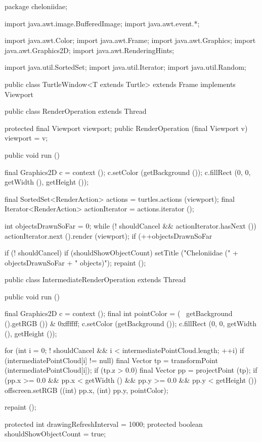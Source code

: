 \documentclass{report}
\begin{document}
\begin{javacode}
package cheloniidae;

import java.awt.image.BufferedImage;
import java.awt.event.*;

import java.awt.Color;
import java.awt.Frame;
import java.awt.Graphics;
import java.awt.Graphics2D;
import java.awt.RenderingHints;

import java.util.SortedSet;
import java.util.Iterator;
import java.util.Random;

public class TurtleWindow<T extends Turtle> extends Frame implements Viewport {
  public class RenderOperation extends Thread {
    protected final Viewport viewport;
    public RenderOperation (final Viewport v) {viewport = v;}

    public void run () {
      final Graphics2D c = context ();
      c.setColor (getBackground ());
      c.fillRect (0, 0, getWidth (), getHeight ());

      final SortedSet<RenderAction> actions        = turtles.actions (viewport);
      final Iterator<RenderAction>  actionIterator = actions.iterator ();

      int objectsDrawnSoFar = 0;
      while (! shouldCancel && actionIterator.hasNext ()) {
        actionIterator.next ().render (viewport);
        if (++objectsDrawnSoFar %
      }

      if (! shouldCancel) {
        if (shouldShowObjectCount) setTitle ("Cheloniidae (" + objectsDrawnSoFar + " objects)");
        repaint ();
      }
    }
  }

  public class IntermediateRenderOperation extends Thread {
    public void run () {
      final Graphics2D c          = context ();
      final int        pointColor = (~ getBackground ().getRGB ()) & 0xffffff;
      c.setColor (getBackground ());
      c.fillRect (0, 0, getWidth (), getHeight ());

      for (int i = 0; ! shouldCancel && i < intermediatePointCloud.length; ++i)
        if (intermediatePointCloud[i] != null) {
          final Vector tp = transformPoint (intermediatePointCloud[i]);
          if (tp.z > 0.0) {
            final Vector pp = projectPoint (tp);
            if (pp.x >= 0.0 && pp.x < getWidth () && pp.y >= 0.0 && pp.y < getHeight ())
              offscreen.setRGB ((int) pp.x, (int) pp.y, pointColor);
          }
        }

      repaint ();
    }
  }

  protected int            drawingRefreshInterval    = 1000;
  protected boolean        shouldShowObjectCount     = true;

}
\end{javacode}
\end{document}
